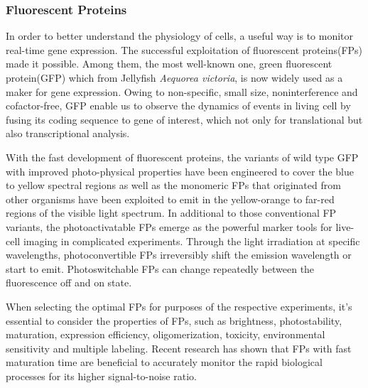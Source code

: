 \documentclass[fleqn,10pt]{wlscirep}
\begin{document}
\subsubsection[]{Fluorescent Proteins}

In order to better understand the physiology of cells, a useful way is to monitor real-time gene expression. The successful exploitation of fluorescent proteins(FPs) made it possible. Among them, the most well-known one, green fluorescent protein(GFP) which from Jellyfish \emph{Aequorea victoria}\cite{SHIMOMURA1962}, is now widely used as a maker for gene expression. Owing to non-specific, small size, noninterference and cofactor-free, GFP enable us to observe the dynamics of events in living cell by fusing its coding sequence to gene of interest\cite{Stearns1995}, which not only for translational but also transcriptional analysis.

With the fast development of fluorescent proteins, the variants of wild type GFP with improved photo-physical properties have been engineered to cover the blue to yellow spectral regions as well as the monomeric FPs that originated from other organisms have been exploited to emit in the yellow-orange to far-red regions of the visible light spectrum\cite{Day2009}. In additional to those conventional FP variants, the photoactivatable FPs emerge as the powerful marker tools for live-cell imaging in complicated experiments. Through the light irradiation at specific wavelengths, photoconvertible FPs irreversibly shift the emission wavelength or start to emit. Photoswitchable FPs can change repeatedly between the fluorescence off and on state\cite{Nienhaus2014}. 

When selecting the optimal FPs for purposes of the respective experiments, it’s essential to consider the properties of FPs, such as brightness, photostability, maturation, expression efficiency, oligomerization, toxicity, environmental sensitivity and multiple labeling\cite{Shaner2005}. Recent research has shown that FPs with fast maturation time are beneficial to accurately monitor the rapid biological processes for its higher signal-to-noise ratio\cite{Balleza2018}.
\end{document}
